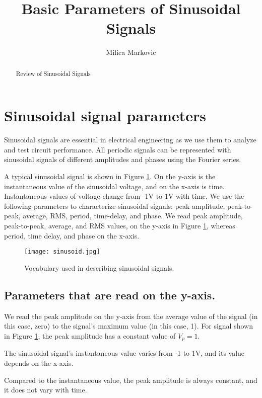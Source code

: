 \documentclass{ximera}
\title{Basic Parameters of Sinusoidal Signals}
\author{Milica Markovic}
\begin{document}
  
\begin{abstract}  
Review of Sinusoidal Signals
\end{abstract}  
\maketitle

\section{Sinusoidal signal parameters}

Sinusoidal signals are essential in electrical engineering as we use them to analyze and test circuit performance. All periodic signals can be represented with sinusoidal signals of different amplitudes and phases using the Fourier series. 

A typical sinusoidal signal is shown in Figure \ref{sinusoid}. On the y-axis is the instantaneous value of the sinusoidal voltage, and on the x-axis is time. Instantaneous values of voltage change from -1V to 1V with time. We use the following parameters to characterize sinusoidal signals: peak amplitude, peak-to-peak, average, RMS, period, time-delay, and phase. We read peak amplitude, peak-to-peak, average, and RMS values, on the y-axis in Figure \ref{sinusoid}, whereas period, time delay, and phase on the x-axis.

\begin{figure}[htbp]
\begin{center}
\texttt{[image: sinusoid.jpg]}
\caption{Vocabulary used in describing sinusoidal signals.}
\label{sinusoid}
\end{center}
\end{figure} 


\subsection{Parameters that are read on the y-axis.}

\begin{definition}
We read the peak amplitude on the y-axis from the average value of the signal (in this case, zero) to the signal's maximum value (in this case, 1). For signal shown in Figure \ref{sinusoid}, the peak  amplitude has a constant value of $V_p=1$. 
\end{definition}


\begin{definition}
The sinusoidal signal's instantaneous value varies from -1 to 1V, and its value depends on the x-axis. 

Compared to the instantaneous value, the peak amplitude is always constant, and it does not vary with time. 
\end{definition}
\end{document}

